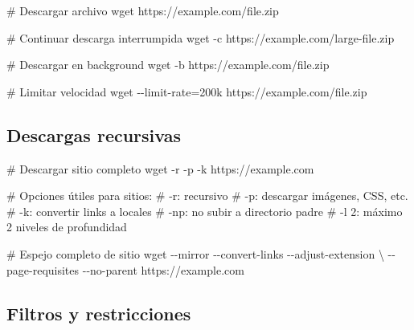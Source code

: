\documentclass[
  11pt,
  letterpaper,
  oneside,
  openany]{scrbook}
\newenvironment{Shaded}{}{}
\newcommand{\AttributeTok}[1]{\textcolor[rgb]{0.84,0.23,0.29}{#1}}
\newcommand{\CommentTok}[1]{\textcolor[rgb]{0.42,0.45,0.49}{#1}}
\newcommand{\DataTypeTok}[1]{\textcolor[rgb]{0.84,0.23,0.29}{#1}}
\newcommand{\FunctionTok}[1]{\textcolor[rgb]{0.44,0.26,0.76}{#1}}
\newcommand{\NormalTok}[1]{\textcolor[rgb]{0.14,0.16,0.18}{#1}}
\newcommand{\OperatorTok}[1]{\textcolor[rgb]{0.14,0.16,0.18}{#1}}
\begin{document}
\begin{Shaded}
\begin{Highlighting}[]
\CommentTok{\# Descargar archivo}
\FunctionTok{wget}\NormalTok{ https://example.com/file.zip}

\CommentTok{\# Continuar descarga interrumpida}
\FunctionTok{wget} \AttributeTok{{-}c}\NormalTok{ https://example.com/large{-}file.zip}

\CommentTok{\# Descargar en background}
\FunctionTok{wget} \AttributeTok{{-}b}\NormalTok{ https://example.com/file.zip}

\CommentTok{\# Limitar velocidad}
\FunctionTok{wget} \AttributeTok{{-}{-}limit{-}rate}\OperatorTok{=}\NormalTok{200k https://example.com/file.zip}
\end{Highlighting}
\end{Shaded}

\subsection{Descargas recursivas}\label{descargas-recursivas}

\begin{Shaded}
\begin{Highlighting}[]
\CommentTok{\# Descargar sitio completo}
\FunctionTok{wget} \AttributeTok{{-}r} \AttributeTok{{-}p} \AttributeTok{{-}k}\NormalTok{ https://example.com}

\CommentTok{\# Opciones útiles para sitios:}
\CommentTok{\# {-}r: recursivo}
\CommentTok{\# {-}p: descargar imágenes, CSS, etc.}
\CommentTok{\# {-}k: convertir links a locales}
\CommentTok{\# {-}np: no subir a directorio padre}
\CommentTok{\# {-}l 2: máximo 2 niveles de profundidad}

\CommentTok{\# Espejo completo de sitio}
\FunctionTok{wget} \AttributeTok{{-}{-}mirror} \AttributeTok{{-}{-}convert{-}links} \AttributeTok{{-}{-}adjust{-}extension} \DataTypeTok{\textbackslash{}}
     \AttributeTok{{-}{-}page{-}requisites} \AttributeTok{{-}{-}no{-}parent}\NormalTok{ https://example.com}
\end{Highlighting}
\end{Shaded}

\subsection{Filtros y restricciones}\label{filtros-y-restricciones}
\end{document}

